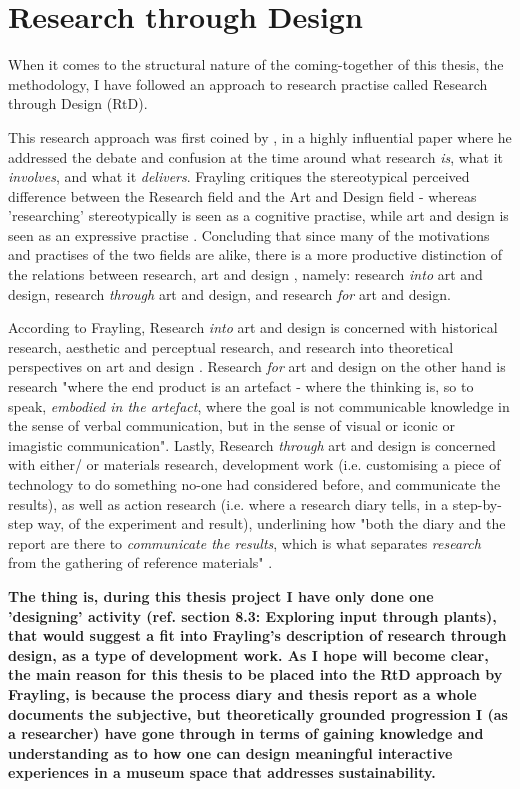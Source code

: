 \section{Research through Design}

When it comes to the structural nature of the coming-together of this thesis, the methodology, I have followed an approach to research practise called Research through Design (RtD).

This research approach was first coined by \autocite{frayling_1994}, in a highly influential paper where he addressed the debate and confusion at the time around what research \emph{is}, what it \emph{involves}, and what it \emph{delivers}. Frayling critiques the stereotypical perceived difference between the Research field and the Art and Design field - whereas 'researching' stereotypically is seen as a cognitive practise, while art and design is seen as an expressive practise \autocite[p. 5]{frayling_1994}. Concluding that since many of the motivations and practises of the two fields are alike, there is a more productive distinction of the relations between research, art and design \autocite[p. 5]{frayling_1994}, namely: research \emph{into} art and design, research \emph{through} art and design, and research \emph{for} art and design. 

According to Frayling, Research \emph{into} art and design is concerned with historical research, aesthetic and perceptual research, and research into theoretical perspectives on art and design \autocite[p. 5]{frayling_1994}. Research \emph{for} art and design on the other hand is research "where the end product is an artefact - where the thinking is, so to speak, \emph{embodied in the artefact}, where the goal is not communicable knowledge in the sense of verbal communication, but in the sense of visual or iconic or imagistic communication"\autocite[p. 5]{frayling_1994}. Lastly, Research \emph{through} art and design is concerned with either/ or materials research, development work (i.e. customising a piece of technology to do something no-one had considered before, and communicate the results), as well as action research (i.e. where a research diary tells, in a step-by-step way, of the experiment and result), underlining how "both the diary and the report are there to \emph{communicate the results}, which is what separates \emph{research} from the gathering of reference materials" \autocite[p. 5]{frayling_1994}.
\par
\textbf{The thing is, during this thesis project I have only done one 'designing' activity (ref. section 8.3: Exploring input through plants), that would suggest a fit into Frayling's description of research through design, as a type of development work. As I hope will become clear, the main reason for this thesis to be placed into the RtD approach by Frayling, is because the process diary and thesis report as a whole documents the subjective, but theoretically grounded progression I (as a researcher) have gone through in terms of gaining knowledge and understanding as to how one can design meaningful interactive experiences in a museum space that addresses sustainability.
}

